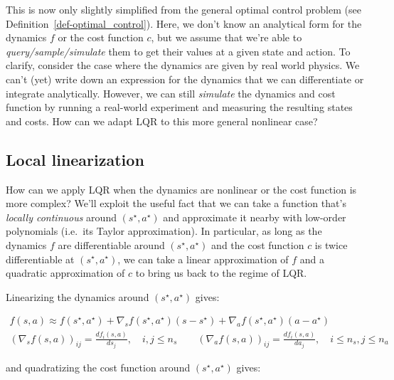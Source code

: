 \documentclass[
  letterpaper,
  DIV=11,
  numbers=noendperiod]{scrreprt}
\theoremstyle{plain}
\theoremstyle{plain}
\theoremstyle{definition}
\theoremstyle{definition}
\theoremstyle{remark}
\begin{document}
This is now only slightly simplified from the general optimal control
problem (see Definition~\ref{def-optimal_control}). Here, we don't know
an analytical form for the dynamics \(f\) or the cost function \(c\),
but we assume that we're able to \emph{query/sample/simulate} them to
get their values at a given state and action. To clarify, consider the
case where the dynamics are given by real world physics. We can't (yet)
write down an expression for the dynamics that we can differentiate or
integrate analytically. However, we can still \emph{simulate} the
dynamics and cost function by running a real-world experiment and
measuring the resulting states and costs. How can we adapt LQR to this
more general nonlinear case?

\subsection{Local linearization}\label{local-linearization}

How can we apply LQR when the dynamics are nonlinear or the cost
function is more complex? We'll exploit the useful fact that we can take
a function that's \emph{locally continuous} around
\((s^\star, a^\star)\) and approximate it nearby with low-order
polynomials (i.e.~its Taylor approximation). In particular, as long as
the dynamics \(f\) are differentiable around \((s^\star, a^\star)\) and
the cost function \(c\) is twice differentiable at
\((s^\star, a^\star)\), we can take a linear approximation of \(f\) and
a quadratic approximation of \(c\) to bring us back to the regime of
LQR.

Linearizing the dynamics around \((s^\star, a^\star)\) gives:

\[
\begin{gathered}
    f(s, a) \approx f(s^\star, a^\star) + \nabla_sf(s^\star, a^\star) (s- s^\star) + \nabla_af(s^\star, a^\star) (a- a^\star) \\
    (\nabla_sf(s, a))_{ij} = \frac{d f_i(s, a)}{d s_j}, \quad i, j \le n_s\qquad (\nabla_af(s, a))_{ij} = \frac{d f_i(s, a)}{d a_j}, \quad i \le n_s, j \le n_a
\end{gathered}
\]

and quadratizing the cost function around \((s^\star, a^\star)\) gives:
\end{document}
